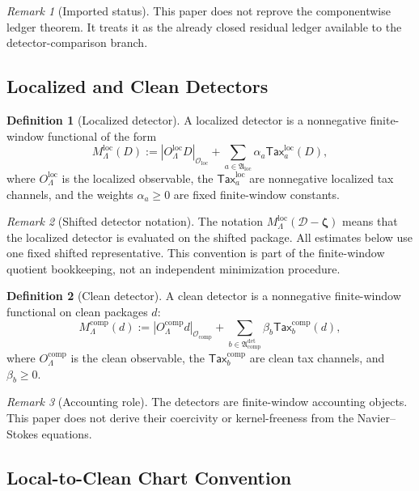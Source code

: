 \documentclass[11pt]{article}
\numberwithin{equation}{section}
\theoremstyle{definition}
\newtheorem{definition}[definition]{Definition}
\theoremstyle{remark}
\newtheorem{remark}[remark]{Remark}
\newcommand{\loc}{\mathrm{loc}}
\newcommand{\comp}{\mathrm{comp}}
\newcommand{\detc}{\mathrm{det}}
\newcommand{\Tax}{\mathsf{Tax}}
\newcommand{\calD}{\mathcal D}
\newcommand{\calO}{\mathcal O}
\newcommand{\bzeta}{\boldsymbol\zeta}
\begin{document}
\begin{remark}[Imported status]
This paper does not reprove the componentwise ledger theorem.  It treats it as
the already closed residual ledger available to the detector-comparison branch.
\end{remark}

\subsection{Localized and Clean Detectors}
\label{sec:detectors}

\begin{definition}[Localized detector]
\label{def:local-detector}
A localized detector is a nonnegative finite-window functional of the form
\[
    M_{\Lambda}^{\loc}(D)
    :=
    |O_{\Lambda}^{\loc}D|_{\calO_{\loc}}
    +
    \sum_{a\in\mathfrak A_{\loc}}
    \alpha_a
    \Tax_a^{\loc}(D),
\]
where \(O_{\Lambda}^{\loc}\) is the localized observable, the
\(\Tax_a^{\loc}\) are nonnegative localized tax channels, and the weights
\(\alpha_a\ge0\) are fixed finite-window constants.
\end{definition}

\begin{remark}[Shifted detector notation]
The notation \(M_{\Lambda}^{\loc}(\calD-\bzeta)\) means that the localized
detector is evaluated on the shifted package.  All estimates below use one
fixed shifted representative.  This convention is part of the finite-window
quotient bookkeeping, not an independent minimization procedure.
\end{remark}

\begin{definition}[Clean detector]
\label{def:clean-detector}
A clean detector is a nonnegative finite-window functional on clean packages
\(d\):
\[
    M_{\Lambda}^{\comp}(d)
    :=
    |O_{\Lambda}^{\comp}d|_{\calO_{\comp}}
    +
    \sum_{b\in\mathfrak A_{\comp}^{\detc}}
    \beta_b
    \Tax_b^{\comp}(d),
\]
where \(O_{\Lambda}^{\comp}\) is the clean observable, the
\(\Tax_b^{\comp}\) are clean tax channels, and \(\beta_b\ge0\).
\end{definition}

\begin{remark}[Accounting role]
The detectors are finite-window accounting objects.  This paper does not
derive their coercivity or kernel-freeness from the Navier--Stokes equations.
\end{remark}

\subsection{Local-to-Clean Chart Convention}
\label{sec:chart}
\end{document}
